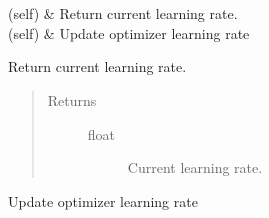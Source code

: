 \documentclass[letterpaper,10pt,english]{sphinxmanual}
\begin{document}
\begin{fulllineitems}
\begin{savenotes}\sphinxatlongtablestart\begin{longtable}[c]{}
\hline

\endfirsthead

%
{}\\
\hline

\endhead

\hline
{}\\
\endfoot

\endlastfoot

{\hyperref[\detokenize{index:pathflowai.schedulers.Scheduler.get_lr}]{}}(self)
&
Return current learning rate.
\\
\hline
{\hyperref[\detokenize{index:pathflowai.schedulers.Scheduler.step}]{}}(self)
&
Update optimizer learning rate
\\
\hline
\end{longtable}\sphinxatlongtableend\end{savenotes}

\begin{fulllineitems}
\label{\detokenize{index:pathflowai.schedulers.Scheduler.get_lr}}
Return current learning rate.
\begin{quote}\begin{description}
\item[{Returns}] \leavevmode\begin{description}
\item[{float}] \leavevmode
Current learning rate.

\end{description}

\end{description}\end{quote}

\end{fulllineitems}


\begin{fulllineitems}
\label{\detokenize{index:pathflowai.schedulers.Scheduler.step}}
Update optimizer learning rate

\end{fulllineitems}


\end{fulllineitems}
\end{document}
